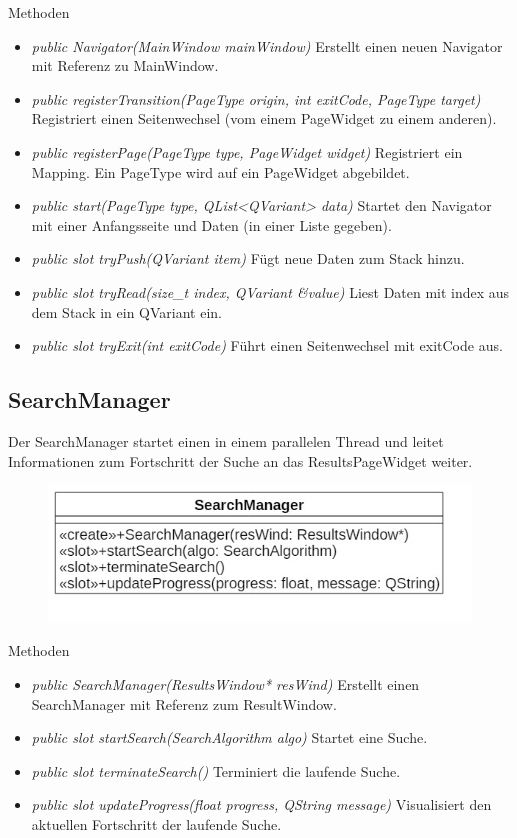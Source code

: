 Methoden
\begin{itemize}
	\item\textit{public Navigator(MainWindow mainWindow)}
	Erstellt einen neuen Navigator mit Referenz zu MainWindow.
	\item\textit{public registerTransition(PageType origin, int exitCode, PageType target)}
	Registriert einen Seitenwechsel (vom einem PageWidget zu einem anderen).
	\item\textit{public registerPage(PageType type, PageWidget widget)}
	Registriert ein Mapping. Ein PageType wird auf ein PageWidget abgebildet.
	\item\textit{public start(PageType type, QList<QVariant> data)}
	Startet den Navigator mit einer Anfangsseite und Daten (in einer Liste gegeben).
	\item\textit{public slot tryPush(QVariant item) }
	Fügt neue Daten zum Stack hinzu.
	\item\textit{public slot tryRead(size\_t index, QVariant \&value) }
	Liest Daten mit index aus dem Stack in ein QVariant ein.
	\item\textit{public slot tryExit(int exitCode)}
	Führt einen Seitenwechsel mit exitCode aus.
	
\end{itemize}

\subsection*{SearchManager}
Der SearchManager startet einen  in einem parallelen Thread und leitet Informationen zum Fortschritt der Suche an das ResultsPageWidget weiter.

\begin{figure}[H]
\centering
\includegraphics[scale=0.5]{img/Klassendiagramm/Klassen/Controller/SearchManager}
\label{fig:searchManager}
\end{figure}

Methoden
\begin{itemize}
	\item\textit{public SearchManager(ResultsWindow* resWind)}
	Erstellt einen SearchManager mit Referenz zum ResultWindow.
	\item\textit{public slot startSearch(SearchAlgorithm algo)}
	Startet eine Suche.
	\item\textit{public slot terminateSearch()}
	Terminiert die laufende Suche.
	\item\textit{public slot updateProgress(float progress, QString message)}
	Visualisiert den aktuellen Fortschritt der laufende Suche.
\end{itemize}

